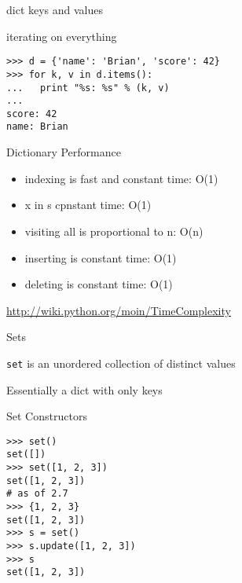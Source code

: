 \documentclass{beamer}
\begin{document}
\begin{frame}[fragile]{dict keys and values}

{\Large iterating on everything}
\vfill
\begin{verbatim}
>>> d = {'name': 'Brian', 'score': 42}
>>> for k, v in d.items():
...   print "%s: %s" % (k, v)
...
score: 42
name: Brian
\end{verbatim}
\vfill
\end{frame}

\begin{frame}[fragile]{Dictionary Performance }

\begin{itemize}
  \item indexing is fast and constant time: O(1)
  \item x in s cpnstant time: O(1)
  \item visiting all is proportional to n: O(n)
  \item inserting is constant time: O(1)
  \item deleting is constant time: O(1)
\end{itemize}

\vfill
\url{ http://wiki.python.org/moin/TimeComplexity}

\end{frame} 



\begin{frame}[fragile]{ Sets }

\vfill
{\Large \verb|set| is an unordered collection of distinct values}

\vfill
{\Large Essentially a dict with only keys}

\vfill

\end{frame} 

\begin{frame}[fragile]{Set Constructors}

\vfill
\begin{verbatim}
>>> set()
set([])
>>> set([1, 2, 3])
set([1, 2, 3])
# as of 2.7
>>> {1, 2, 3}
set([1, 2, 3])
>>> s = set()
>>> s.update([1, 2, 3])
>>> s
set([1, 2, 3])
\end{verbatim}
\vfill

\end{frame}
\end{document}
